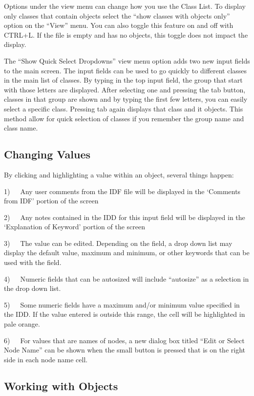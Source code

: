 Options under the view menu can change how you use the Class List. To display only classes that contain objects select the ``show classes with objects only'' option on the ``View'' menu. You can also toggle this feature on and off with CTRL+L. If the file is empty and has no objects, this toggle does not impact the display.

The ``Show Quick Select Dropdowns'' view menu option adds two new input fields to the main screen. The input fields can be used to go quickly to different classes in the main list of classes. By typing in the top input field, the group that start with those letters are displayed. After selecting one and pressing the tab button, classes in that group are shown and by typing the first few letters, you can easily select a specific class. Pressing tab again displays that class and it objects. This method allow for quick selection of classes if you remember the group name and class name.

\subsection{Changing Values}\label{changing-values}

By clicking and highlighting a value within an object, several things happen:

1)~~~Any user comments from the IDF file will be displayed in the `Comments from IDF' portion of the screen

2)~~~Any notes contained in the IDD for this input field will be displayed in the `Explanation of Keyword' portion of the screen

3)~~~The value can be edited. Depending on the field, a drop down list may display the default value, maximum and minimum, or other keywords that can be used with the field.

4)~~~Numeric fields that can be autosized will include ``autosize'' as a selection in the drop down list.

5)~~~Some numeric fields have a maximum and/or minimum value specified in the IDD. If the value entered is outside this range, the cell will be highlighted in pale orange.

6)~~~For values that are names of nodes, a new dialog box titled ``Edit or Select Node Name'' can be shown when the small button is pressed that is on the right side in each node name cell.

\subsection{Working with Objects}\label{working-with-objects}

